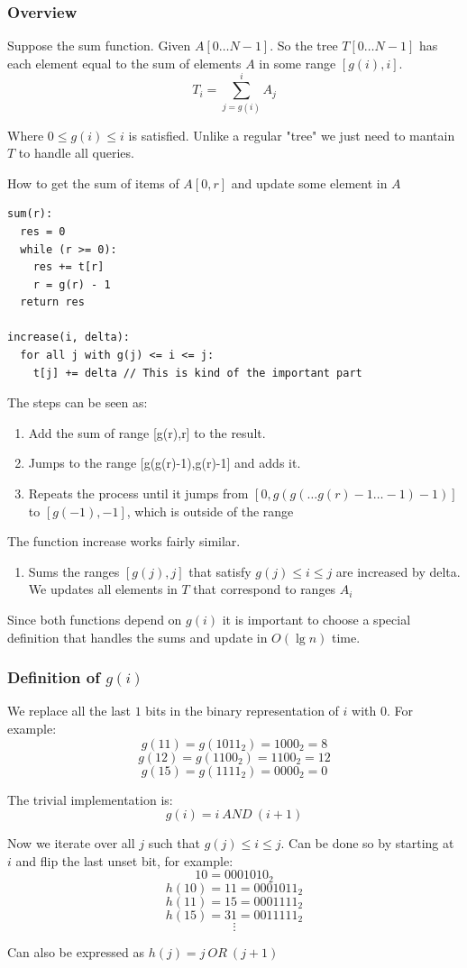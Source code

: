 \documentclass{IEEEtran}
\begin{document}
      \subsubsection{Overview}
        Suppose the sum function. Given $A[0\ldots N-1]$. So the tree $T[0\ldots N-1]$ has each element equal to the sum of elements $A$ in some range $[g(i),i]$.
        $$T_i=\sum_{j=g(i)}^i A_j$$
        \par Where $0\leq  g(i)\leq i$ is satisfied. Unlike a regular "tree" we just need to mantain $T$ to handle all queries.\par
        How to get the sum of items of $A[0,r]$ and update some element in $A$
        \begin{lstlisting}
sum(r):
  res = 0 
  while (r >= 0):
    res += t[r]
    r = g(r) - 1 
  return res

increase(i, delta):
  for all j with g(j) <= i <= j:
    t[j] += delta // This is kind of the important part
        \end{lstlisting}
        \par The steps can be seen as:
        \begin{enumerate}
          \item Add the sum of range [g(r),r] to the result.
          \item Jumps to the range [g(g(r)-1),g(r)-1] and adds it.
          \item Repeats the process until it jumps from $[0,g(g(\ldots g(r)-1\ldots-1)-1)]$ to $[g(-1),-1]$, which is outside of the range
        \end{enumerate}
        The function increase works fairly similar.
        \begin{enumerate}
          \item Sums the ranges $[g(j),j]$ that satisfy $g(j)\leq i \leq j$ are increased by delta. We updates all elements in $T$ that correspond to ranges $A_i$
        \end{enumerate}
        \par Since both functions depend on $g(i)$ it is important to choose a special definition that handles the sums and update in $O(\lg{n})$ time.
      \subsubsection{Definition of $g(i)$}
        We replace all the last $1$ bits in the binary representation of $i$ with $0$. For example:
        $$g(11)=g(1011_2)=1000_2=8$$
        $$g(12)=g(1100_2)=1100_2=12$$
        $$g(15)=g(1111_2)=0000_2=0$$
        \par The trivial implementation is:
        $$g(i)=i\ AND\ (i+1)$$
        \par Now we iterate over all $j$ such that $g(j)\leq i \leq j$. Can be done so by starting at $i$ and flip the last unset bit, for example:
        $$10=0001010_2$$
        $$h(10)=11=0001011_2$$
        $$h(11)=15=0001111_2$$
        $$h(15)=31=0011111_2$$
        $$\vdots$$
        \par Can also be expressed as $h(j) = j\ OR\ (j+1)$
\end{document}
